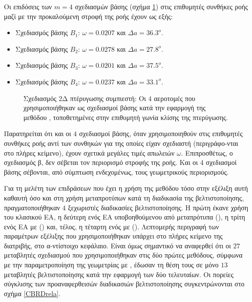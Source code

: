 Οι επιδόσεις των $m\!=\!4$ σχεδιασμών βάσης (σχήμα \ref{CBRarch}) στις επιθυμητές συνθήκες ροής μαζί με την προκαλούμενη στροφή της ροής έχουν ως εξής:  
\begin{itemize}
\item{Σχεδιασμός βάσης $Β_1$:} $\omega=0.0207$ και $\Delta a=36.3^o$.
\item{Σχεδιασμός βάσης $Β_2$:} $\omega=0.0278$ και $\Delta a=27.8^o$.
\item{Σχεδιασμός βάσης $Β_3$:} $\omega=0.0201$ και $\Delta a=37.5^o$.
\item{Σχεδιασμός βάσης $Β_4$:} $\omega=0.0237$ και $\Delta a=33.1^o$.
\end{itemize}
 
\begin{figure}[h!]
\begin{minipage}[b]{1\linewidth}
 \centering
\end{minipage}
\caption{Σχεδιασμός 2Δ πτέρυγωσης συμπιεστή: Οι $4$ αεροτομές που  χρησιμοποιήθηκαν ως σχεδιασμοί βάσης κατά την εφαρμογή της μεθόδου , τοποθετημένες στην επιθυμητή γωνία κλίσης της πτερύγωσης.} 
\label{CBRarch}
\end{figure}

Παρατηρείται ότι και οι $4$ σχεδιασμοί βάσης, όταν χρησιμοποιηθούν στις επιθυμητές συνθήκες ροής αντί των συνθηκών για της οποίες είχαν σχεδιαστή (περιγράφο-νται στο πλήρες κείμενο), έχουν σχετικά μεγάλες τιμές απωλειών $\omega$. Επιπροσθέτως, ο σχεδιασμός β, δεν σέβεται τον περιορισμό στροφής της ροής. Και οι $4$ σχεδιασμοί βάσης σέβονται, από σύμπτωση ενδεχομένως, τους γεωμετρικούς περιορισμούς.    

Για τη μελέτη των επιδράσεων που έχει η χρήση της μεθόδου  τόσο στην εξέλιξη αυτή καθαυτή όσο και στη χρήση μεταπροτύπων κατά τη διαδικασία της βελτιστοποίησης, πραγματοποιήθηκαν $4$ ξεχωριστές διαδικασίες βελτιστοποίησης. Η πρώτη έκανε χρήση του κλασικού ΕΑ, η δεύτερη ενός ΕΑ υποβοηθούμενου από μεταπρότυπα (), η τρίτη ενός ΕΑ με  () και, τέλος, η τέταρτη ενός  με  (). Λεπτομερής περιγραφή των παραμέτρων εξέλιξης που χρησιμοποιήθηκαν υπάρχει στο πλήρες κείμενο της διατριβής, στο α-ντίστοιχο κεφάλαιο. Είναι όμως σημαντικό να αναφερθεί ότι οι $27$ μεταβλητές σχεδιασμού που χρησιμοποιήθηκαν στις δύο πρώτες μεθόδους, σύμφωνα με την παραμετροποίηση της γεωμετρίας με , έδωσαν τη θέση τους σε μόνο $13$ μεταβλητές βελτιστοποίησης κατά την εφαρμογή των δύο τελευταίων.   
Οι πορείες σύγκλισης των προαναφερθεισών διαδικασιών βελτιστοποίησης συγκεντρώνονται στο σχήμα \ref{CBRDrela}.           

